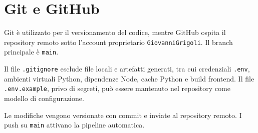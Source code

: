 \chapter{Git e GitHub}

Git è utilizzato per il versionamento del codice, mentre GitHub ospita il repository remoto sotto l'account proprietario \texttt{GiovanniGrigoli}. Il branch principale è \texttt{main}.

Il file \texttt{.gitignore} esclude file locali e artefatti generati, tra cui credenziali \texttt{.env}, ambienti virtuali Python, dipendenze Node, cache Python e build frontend. Il file \texttt{.env.example}, privo di segreti, può essere mantenuto nel repository come modello di configurazione.

Le modifiche vengono versionate con commit e inviate al repository remoto. I push su \texttt{main} attivano la pipeline automatica.
